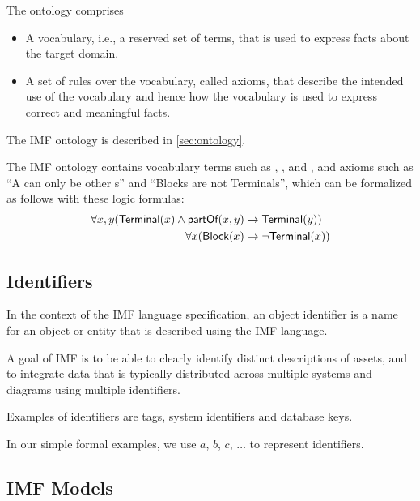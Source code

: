 The ontology comprises 
\begin{itemize}
\item A vocabulary, i.e., a reserved set of terms, that is used to express
  facts about the target domain.
\item A set of rules over the vocabulary, called axioms, that
  describe the intended use of the vocabulary and hence how the
  vocabulary is used to express correct and meaningful facts.
\end{itemize}

The IMF ontology is described in \autoref{sec:ontology}.

\begin{example}\label{ex:imf-ontology}
  The IMF ontology contains vocabulary terms such as ,
  ,  and , and axioms such as
  ``A  can only be  other s'' and
  ``Blocks are not Terminals'', which can be formalized as follows
  with these logic formulas:
\begin{align*}
\forall x,y ( \textsf{Terminal}(x) \land \textsf{partOf}(x,y) &\rightarrow \textsf{Terminal}(y))\\
\forall x ( \textsf{Block}(x) &\rightarrow \neg \textsf{Terminal}(x))
\end{align*}
\end{example}

\subsection{Identifiers}

In the context of the IMF language specification, an object identifier
is a name for an object or entity that is described using the IMF language.

A goal of IMF is to be able to clearly identify distinct descriptions
of assets, and to integrate data that is typically distributed across
multiple systems and diagrams using multiple identifiers.


\begin{example}
  Examples of identifiers are tags, system identifiers and database keys.

  In our simple formal examples, we use $a$, $b$,
  $c$, $\ldots$ to represent identifiers.
\end{example}

\subsection{IMF Models}

